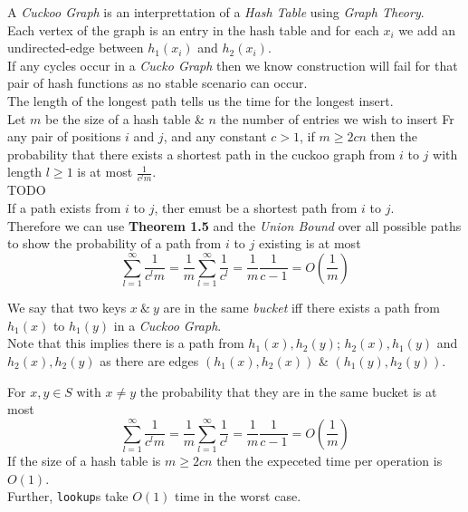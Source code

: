 \documentclass[11pt,a4paper]{article}
\begin{document}
A \textit{Cuckoo Graph} is an interprettation of a \textit{Hash Table} using \textit{Graph Theory}.\\
Each vertex of the graph is an entry in the hash table and for each $x_i$ we add an undirected-edge between $h_1(x_i)$ and $h_2(x_i)$.\\
If any cycles occur in a \textit{Cucko Graph} then we know construction will fail for that pair of hash functions as no stable scenario can occur.\\
The length of the longest path tells us the time for the longest insert.\\

Let $m$ be the size of a hash table \& $n$ the number of entries we wish to insert
Fr any pair of positions $i$ and $j$, and any constant $c>1$, if $m\geq2cn$ then the probability that there exists a shortest path in the cuckoo graph from $i$ to $j$ with length $l\geq1$ is at most $\frac1{c^lm}$.\\

TODO\\

If a path exists from $i$ to $j$, ther emust be a shortest path from $i$ to $j$.\\
Therefore we can use \textbf{Theorem 1.5} and the \textit{Union Bound} over all possible paths to show the probability of a path from $i$ to $j$ existing is at most
$$\sum_{l=1}^\infty\frac1{c^lm}=\frac1m\sum_{l=1}^\infty\frac1{c^l}=\frac1m\frac1{c-1}=O\left(\frac1m\right)$$

We say that two keys $x\ \&\ y$ are in the same \textit{bucket} iff there exists a path from $h_1(x)$ to $h_1(y)$ in a \textit{Cuckoo Graph}.\\
Note that this implies there is a path from $h_1(x),h_2(y)$; $h_2(x),h_1(y)$ and $h_2(x),h_2(y)$ as there are edges $(h_1(x),h_2(x))$ \& $(h_1(y),h_2(y))$.\\


For $x,y\in S$ with $x\neq y$ the probability that they are in the same bucket is at most
$$\sum_{l=1}^\infty\frac1{c^lm}=\frac1m\sum_{l=1}^\infty\frac1{c^l}=\frac1m\frac1{c-1}=O\left(\frac1m\right)$$
If the size of a hash table is $m\geq2cn$ then the expeceted time per operation is $O(1)$.\\
Further, \lstinline!lookup!s take $O(1)$ time in the worst case.\\
\end{document}
